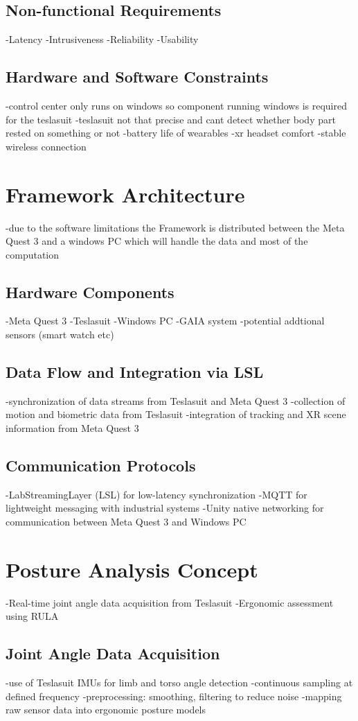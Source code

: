 \subsection{Non-functional Requirements}
-Latency 
-Intrusiveness
-Reliability
-Usability
\subsection{Hardware and Software Constraints}
-control center only runs on windows so component running windows is required for the teslasuit
-teslasuit not that precise and cant detect whether body part rested on something or not
-battery life of wearables
-xr headset comfort
-stable wireless connection

\section{Framework Architecture}
-due to the software limitations the Framework is distributed between the Meta Quest 3 and a windows PC which will handle the data and most of the computation
\subsection{Hardware Components}
-Meta Quest 3
-Teslasuit
-Windows PC
-GAIA system
-potential addtional sensors (smart watch etc)
\subsection{Data Flow and Integration via LSL}
-synchronization of data streams from Teslasuit and Meta Quest 3 
-collection of motion and biometric data from Teslasuit
-integration of tracking and XR scene information from Meta Quest 3
\subsection{Communication Protocols}
-LabStreamingLayer (LSL) for low-latency synchronization
-MQTT for lightweight messaging with industrial systems
-Unity native networking for communication between Meta Quest 3 and Windows PC

\section{Posture Analysis Concept}
-Real-time joint angle data acquisition from Teslasuit
-Ergonomic assessment using RULA
\subsection{Joint Angle Data Acquisition}
-use of Teslasuit IMUs for limb and torso angle detection
-continuous sampling at defined frequency
-preprocessing: smoothing, filtering to reduce noise
-mapping raw sensor data into ergonomic posture models
